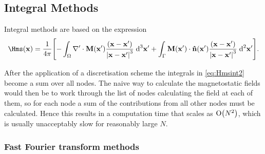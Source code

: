 \subsection{Integral Methods}
\label{sec:magstat-field-calc-inte}



Integral methods are based on the expression
\begin{equation}
  \Hms(\xv) = \frac{1}{4 \pi} \bigs{ 
    - \int_\magd \nabla' \cdot \Mv(\xv') \frac{(\xv - \xv')}{\abs{\xv -\xv'}^3} \d^3 \xv'
    + \int_\boundd \Mv(\xv') \cdot \nv(\xv') \frac{(\xv - \xv')}{\abs{\xv - \xv'}^3} \d^2 \xv' }.
  \label{eq:Hmsint2}
\end{equation}

After the application of a discretisation scheme the integrals in \cref{eq:Hmsint2} become a sum over all nodes.
The naive way to calculate the magnetostatic fields would then be to work through the list of nodes calculating the field at each of them, so for each node a sum of the contributions from all other nodes must be calculated.
Hence this results in a computation time that scales as $\text{O}{\left( N^2 \right)}$, which is usually unacceptably slow for reasonably large $N$.


\subsubsection{Fast Fourier transform methods}

